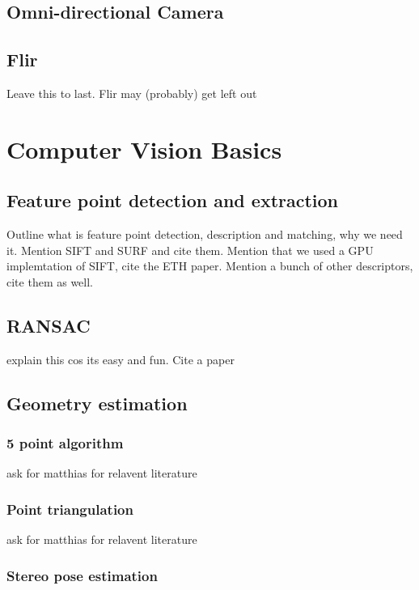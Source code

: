 \subsection{Omni-directional Camera}


\subsection{Flir}
Leave this to last.  Flir may (probably) get left out

\section{Computer Vision Basics}

\subsection{Feature point detection and extraction}
\label{subsec:features}

Outline what is feature point detection, description and matching, why we need
it.  Mention SIFT
and SURF and cite them.  Mention that we used a GPU implemtation of SIFT, cite
the ETH paper. 
Mention a bunch of other descriptors, cite them as well.

\subsection{RANSAC}
\label{subsec:RANSAC}

explain this cos its easy and fun.  Cite a paper

\subsection{Geometry estimation}

\subsubsection{5 point algorithm}
\label{subsec:5point}
ask for matthias for relavent literature

\subsubsection{Point triangulation}

ask for matthias for relavent literature

\subsubsection{Stereo pose estimation}
\label{subsec:horn}

